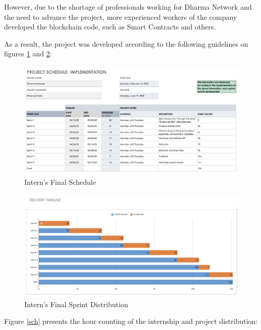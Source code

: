However, due to the shortage of professionals working for Dharma Network and the need to advance the project, more experienced workers of the company developed the blockchain code, such as Smart Contracts and others.\newline

As a result, the project was developed according to the following guidelines on figures \ref{act_sch} and \ref{act_days}:\newline

 \begin{figure}[htbp]
	\centering
	\includegraphics[scale=0.4]{figures/act_sch.png}  %
	\caption{Intern's Final Schedule}
	\label{act_sch}
\end{figure}

 \begin{figure}[htbp]
	\centering
	\includegraphics[scale=0.4]{figures/act_days.png}  %
	\caption{Intern's Final Sprint Distribution}
	\label{act_days}
\end{figure}

Figure \ref{sch} presents the hour counting of the internship and project distribution:



